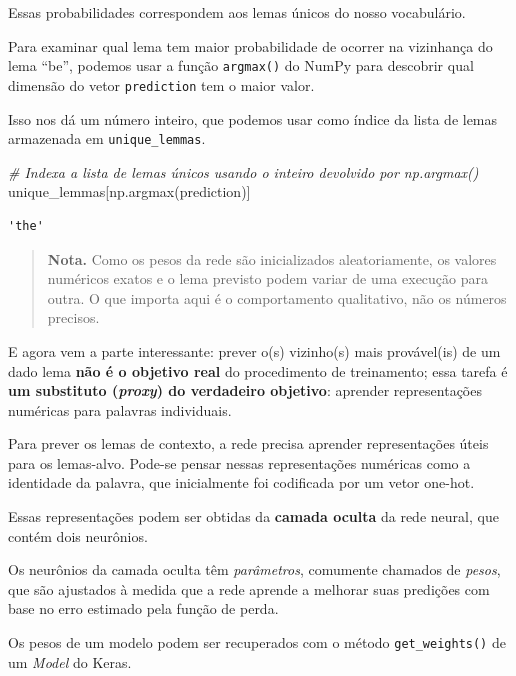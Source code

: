 \documentclass[
  brazilian,
]{article}
\newenvironment{Shaded}{}{}
\newcommand{\CommentTok}[1]{\textcolor[rgb]{0.38,0.63,0.69}{\textit{#1}}}
\newcommand{\NormalTok}[1]{#1}
\begin{document}
Essas probabilidades correspondem aos lemas únicos do nosso vocabulário.

Para examinar qual lema tem maior probabilidade de ocorrer na vizinhança
do lema ``be'', podemos usar a função \texttt{argmax()} do NumPy para
descobrir qual dimensão do vetor \texttt{prediction} tem o maior valor.

Isso nos dá um número inteiro, que podemos usar como índice da lista de
lemas armazenada em \texttt{unique\_lemmas}.

\begin{Shaded}
\begin{Highlighting}[]
\CommentTok{\# Indexa a lista de lemas únicos usando o inteiro devolvido por np.argmax()}
\NormalTok{unique\_lemmas[np.argmax(prediction)]}
\end{Highlighting}
\end{Shaded}

\begin{verbatim}
'the'
\end{verbatim}

\begin{quote}
\textbf{Nota.} Como os pesos da rede são inicializados aleatoriamente,
os valores numéricos exatos e o lema previsto podem variar de uma
execução para outra. O que importa aqui é o comportamento qualitativo,
não os números precisos.
\end{quote}

E agora vem a parte interessante: prever o(s) vizinho(s) mais
provável(is) de um dado lema \textbf{não é o objetivo real} do
procedimento de treinamento; essa tarefa é \textbf{um substituto
(\emph{proxy}) do verdadeiro objetivo}: aprender representações
numéricas para palavras individuais.

Para prever os lemas de contexto, a rede precisa aprender representações
úteis para os lemas-alvo. Pode-se pensar nessas representações numéricas
como a identidade da palavra, que inicialmente foi codificada por um
vetor one-hot.

Essas representações podem ser obtidas da \textbf{camada oculta} da rede
neural, que contém dois neurônios.

Os neurônios da camada oculta têm \emph{parâmetros}, comumente chamados
de \emph{pesos}, que são ajustados à medida que a rede aprende a
melhorar suas predições com base no erro estimado pela função de perda.

Os pesos de um modelo podem ser recuperados com o método
\texttt{get\_weights()} de um \emph{Model} do Keras.
\end{document}
